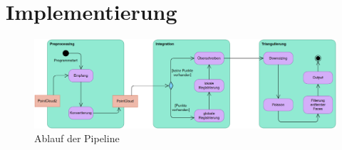
\chapter{Implementierung}
\label{ch:implementierung}

\begin{figure}[ht]
	\centering
	\includegraphics[width=\textwidth]{images/pipeline.png}
	\caption{Ablauf der Pipeline}
	\label{fig:pipeline}
\end{figure}

